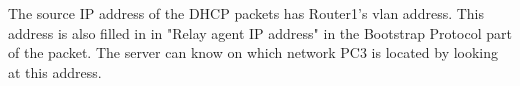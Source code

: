 The source IP address of the DHCP packets has Router1's vlan address. This address is also filled in in "Relay agent IP address" in the Bootstrap Protocol part of the packet. The server can know on which network PC3 is located by looking at this address.
